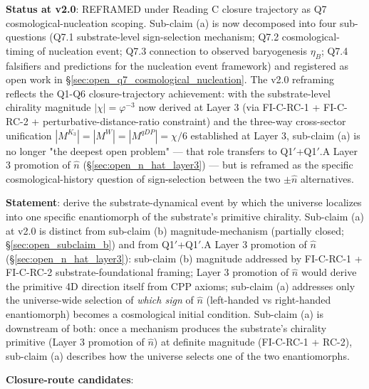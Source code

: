 \documentclass[11pt,letterpaper]{article}
\newcommand{\phig}{\varphi}
\newcommand{\Kthree}{\ensuremath{K_3}}
\begin{document}
\textbf{Status at v2.0}: REFRAMED under Reading C closure trajectory as Q7 cosmological-nucleation scoping. Sub-claim (a) is now decomposed into four sub-questions (Q7.1 substrate-level sign-selection mechanism; Q7.2 cosmological-timing of nucleation event; Q7.3 connection to observed baryogenesis $\eta_B$; Q7.4 falsifiers and predictions for the nucleation event framework) and registered as open work in \S\ref{sec:open_q7_cosmological_nucleation}. The v2.0 reframing reflects the Q1-Q6 closure-trajectory achievement: with the substrate-level chirality magnitude $|\chi| = \phig^{-3}$ now derived at Layer 3 (via FI-C-RC-1 + FI-C-RC-2 + perturbative-distance-ratio constraint) and the three-way cross-sector unification $|M^{\Kthree}| = |M^W| = |M^{qDP}| = \chi/6$ established at Layer 3, sub-claim (a) is no longer "the deepest open problem" --- that role transfers to Q1$'$+Q1$'$.A Layer 3 promotion of $\hat{n}$ (\S\ref{sec:open_n_hat_layer3}) --- but is reframed as the specific cosmological-history question of sign-selection between the two $\pm\hat{n}$ alternatives.

\textbf{Statement}: derive the substrate-dynamical event by which the universe localizes into one specific enantiomorph of the substrate's primitive chirality. Sub-claim (a) at v2.0 is distinct from sub-claim (b) magnitude-mechanism (partially closed; \S\ref{sec:open_subclaim_b}) and from Q1$'$+Q1$'$.A Layer 3 promotion of $\hat{n}$ (\S\ref{sec:open_n_hat_layer3}): sub-claim (b) magnitude addressed by FI-C-RC-1 + FI-C-RC-2 substrate-foundational framing; Layer 3 promotion of $\hat{n}$ would derive the primitive 4D direction itself from CPP axioms; sub-claim (a) addresses only the universe-wide selection of \emph{which sign} of $\hat{n}$ (left-handed vs right-handed enantiomorph) becomes a cosmological initial condition. Sub-claim (a) is downstream of both: once a mechanism produces the substrate's chirality primitive (Layer 3 promotion of $\hat{n}$) at definite magnitude (FI-C-RC-1 + RC-2), sub-claim (a) describes how the universe selects one of the two enantiomorphs.

\textbf{Closure-route candidates}:
\end{document}
